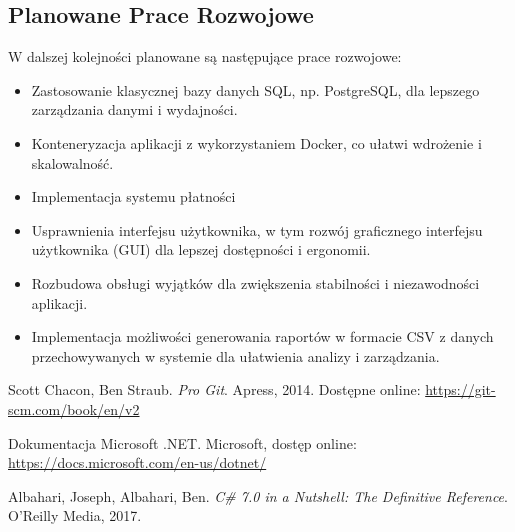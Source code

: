 \documentclass{article}
\begin{document}

\subsection{Planowane Prace Rozwojowe}
W dalszej kolejności planowane są następujące prace rozwojowe:
\begin{itemize}
    \item Zastosowanie klasycznej bazy danych SQL, np. PostgreSQL, dla lepszego zarządzania danymi i wydajności.
    \item Konteneryzacja aplikacji z wykorzystaniem Docker, co ułatwi wdrożenie i skalowalność.
    \item Implementacja systemu płatności 
    \item Usprawnienia interfejsu użytkownika, w tym rozwój graficznego interfejsu użytkownika (GUI) dla lepszej dostępności i ergonomii.
    \item Rozbudowa obsługi wyjątków dla zwiększenia stabilności i niezawodności aplikacji.
    \item Implementacja możliwości generowania raportów w formacie CSV z danych przechowywanych w systemie dla ułatwienia analizy i zarządzania.
\end{itemize}
\clearpage 
\listoffigures 

\clearpage 
\begin{thebibliography}{9}

Scott Chacon, Ben Straub. \textit{Pro Git}. Apress, 2014. Dostępne online: \url{https://git-scm.com/book/en/v2}

Dokumentacja Microsoft .NET. Microsoft, dostęp online: \url{https://docs.microsoft.com/en-us/dotnet/}



Albahari, Joseph, Albahari, Ben. \textit{C\# 7.0 in a Nutshell: The Definitive Reference}. O'Reilly Media, 2017.

\end{thebibliography}
\end{document}

